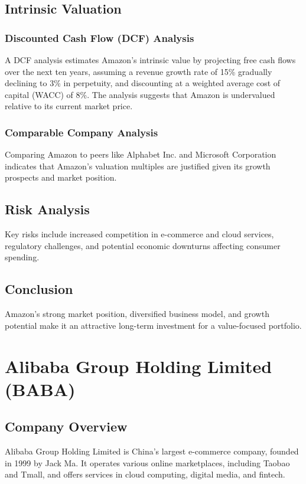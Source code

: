 \documentclass[12pt]{report}
\begin{document}
\section{Intrinsic Valuation}
\subsection{Discounted Cash Flow (DCF) Analysis}
A DCF analysis estimates Amazon's intrinsic value by projecting free cash flows over the next ten years, assuming a revenue growth rate of 15\% gradually declining to 3\% in perpetuity, and discounting at a weighted average cost of capital (WACC) of 8\%. The analysis suggests that Amazon is undervalued relative to its current market price.

\subsection{Comparable Company Analysis}
Comparing Amazon to peers like Alphabet Inc. and Microsoft Corporation indicates that Amazon's valuation multiples are justified given its growth prospects and market position.

\section{Risk Analysis}
Key risks include increased competition in e-commerce and cloud services, regulatory challenges, and potential economic downturns affecting consumer spending.

\section{Conclusion}
Amazon's strong market position, diversified business model, and growth potential make it an attractive long-term investment for a value-focused portfolio.

\chapter{Alibaba Group Holding Limited (BABA)}
\section{Company Overview}
Alibaba Group Holding Limited is China's largest e-commerce company, founded in 1999 by Jack Ma. It operates various online marketplaces, including Taobao and Tmall, and offers services in cloud computing, digital media, and fintech.
\end{document}
